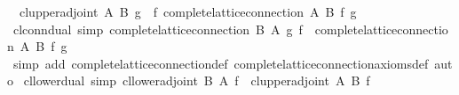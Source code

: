 \begin{isabellebody}
\ \ {}cl{}upper{}adjoint\ A\ B\ g\ {}\ {}f{}\ complete{}lattice{}connection\ A\ B\ f\ g{}\isanewline
\isanewline
{}\isamarkupfalse%
\ cl{}conn{}dual\ {}simp{}{}\ {}complete{}lattice{}connection\ {}B{}{}\ {}A{}{}\ g\ f\ {}\ complete{}lattice{}connection\ A\ B\ f\ g{}\isanewline
%
\isadelimproof
\ \ %
\endisadelimproof
%
\isatagproof
{}\isamarkupfalse%
\ {}simp\ add{}\ complete{}lattice{}connection{}def\ complete{}lattice{}connection{}axioms{}def{}\ auto{}%
\endisatagproof
{\isafoldproof}%
%
\isadelimproof
\isanewline
%
\endisadelimproof
\isanewline
{}\isamarkupfalse%
\ cl{}lower{}dual\ {}simp{}{}\ {}cl{}lower{}adjoint\ {}B{}{}\ {}A{}{}\ f\ {}\ cl{}upper{}adjoint\ A\ B\ f{}\isanewline

\end{isabellebody}
